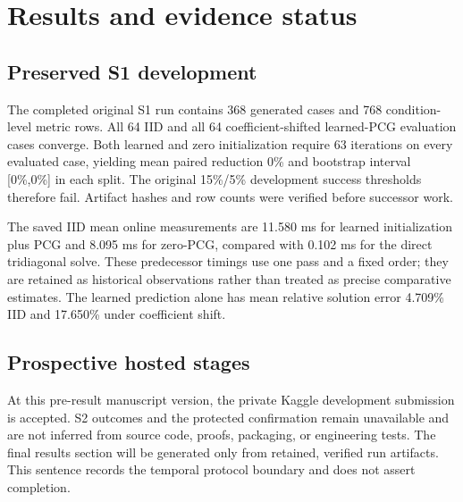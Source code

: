 \section{Results and evidence status}
\subsection{Preserved S1 development}
The completed original S1 run contains 368 generated cases and 768 condition-level metric rows. All 64 IID and all 64 coefficient-shifted learned-PCG evaluation cases converge. Both learned and zero initialization require 63 iterations on every evaluated case, yielding mean paired reduction 0\% and bootstrap interval [0\%,0\%] in each split. The original 15\%/5\% development success thresholds therefore fail. Artifact hashes and row counts were verified before successor work.

The saved IID mean online measurements are 11.580 ms for learned initialization plus PCG and 8.095 ms for zero-PCG, compared with 0.102 ms for the direct tridiagonal solve. These predecessor timings use one pass and a fixed order; they are retained as historical observations rather than treated as precise comparative estimates. The learned prediction alone has mean relative solution error 4.709\% IID and 17.650\% under coefficient shift.

\subsection{Prospective hosted stages}
At this pre-result manuscript version, the private Kaggle development submission is accepted. S2 outcomes and the protected confirmation remain unavailable and are not inferred from source code, proofs, packaging, or engineering tests. The final results section will be generated only from retained, verified run artifacts. This sentence records the temporal protocol boundary and does not assert completion.
